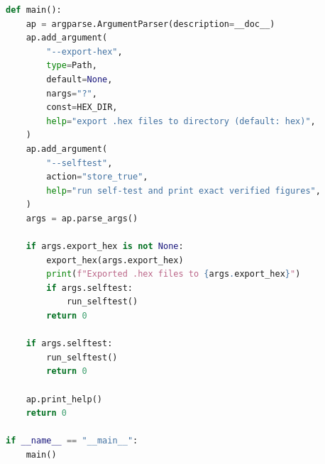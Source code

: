 \documentclass[11pt,a4paper]{article}
\begin{document}
\begin{lstlisting}[language=Python]
def main():
    ap = argparse.ArgumentParser(description=__doc__)
    ap.add_argument(
        "--export-hex",
        type=Path,
        default=None,
        nargs="?",
        const=HEX_DIR,
        help="export .hex files to directory (default: hex)",
    )
    ap.add_argument(
        "--selftest",
        action="store_true",
        help="run self-test and print exact verified figures",
    )
    args = ap.parse_args()

    if args.export_hex is not None:
        export_hex(args.export_hex)
        print(f"Exported .hex files to {args.export_hex}")
        if args.selftest:
            run_selftest()
        return 0

    if args.selftest:
        run_selftest()
        return 0

    ap.print_help()
    return 0

if __name__ == "__main__":
    main()
\end{lstlisting}
\end{document}
